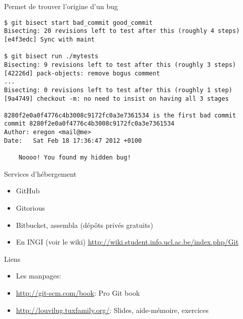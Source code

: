 \begin{frame}[fragile]{}
Permet de trouver l'origine d'un bug

\begin{footnotesize}
\begin{verbatim}
$ git bisect start bad_commit good_commit
Bisecting: 20 revisions left to test after this (roughly 4 steps)
[e4f3edc] Sync with maint

$ git bisect run ./mytests
Bisecting: 9 revisions left to test after this (roughly 3 steps)
[42226d] pack-objects: remove bogus comment
...
Bisecting: 0 revisions left to test after this (roughly 1 step)
[9a4749] checkout -m: no need to insist on having all 3 stages

8280f2e0a0f4776c4b3008c9172fc0a3e7361534 is the first bad commit
commit 8280f2e0a0f4776c4b3008c9172fc0a3e7361534
Author: eregon <mail@me>
Date:   Sat Feb 18 17:36:47 2012 +0100

    Noooo! You found my hidden bug!
\end{verbatim}
\end{footnotesize}
\end{frame}


\begin{frame}{Services d'hébergement}
  \begin{itemize}
    \item GitHub
    \medskip
    \item Gitorious
    \medskip
    \item Bitbucket, assembla (dépôts privés gratuits)
    \medskip
    \item En INGI (voir le wiki)
          \url{http://wiki.student.info.ucl.ac.be/index.php/Git}
  \end{itemize}
\end{frame}

\begin{frame}{Liens}
\begin{itemize}
  \item Les manpages: 
  \item \url{http://git-scm.com/book}: Pro Git book
  \item \url{http://louvilug.tuxfamily.org/}: Slides, aide-mémoire, exercices
\end{itemize}
\end{frame}
\usebackgroundtemplate{}
